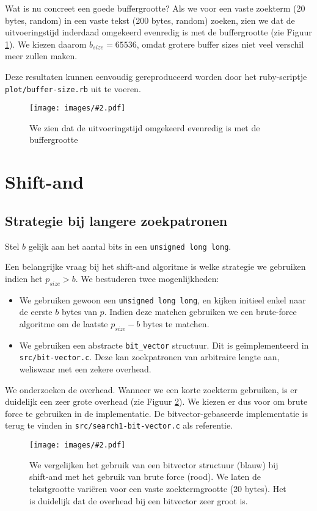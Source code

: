 \documentclass[a4paper,11pt]{article}
\newcommand{\image}[3][1]{
    \begin{figure}
    \begin{center}
    \texttt{[image: images/\#2.pdf]}
    \caption{#3}
    \label{fig:#2}
    \end{center}
    \end{figure}
}
\newcommand{\reproduce}[1]{
    Deze resultaten kunnen eenvoudig gereproduceerd worden door het
    ruby-scriptje \texttt{#1} uit te voeren.
}
\begin{document}
Wat is nu concreet een goede buffergrootte? Als we voor een vaste zoekterm (20
bytes, random) in een vaste tekst (200 bytes, random) zoeken, zien we dat de
uitvoeringstijd inderdaad omgekeerd evenredig is met de buffergrootte (zie
Figuur \ref{fig:plot-buffer-size}). We kiezen daarom $b_{size} = 65536$, omdat
grotere buffer sizes niet veel verschil meer zullen maken.

\reproduce{plot/buffer-size.rb}

\image{plot-buffer-size}{We zien dat de uitvoeringstijd omgekeerd evenredig is
met de buffergrootte}

\section{Shift-and}

\subsection{Strategie bij langere zoekpatronen}

Stel $b$ gelijk aan het aantal bits in een \verb#unsigned long long#.

Een belangrijke vraag bij het shift-and algoritme is welke strategie we
gebruiken indien het $p_{size} > b$. We bestuderen twee mogenlijkheden:

\begin{itemize}
    \item We gebruiken gewoon een \verb#unsigned long long#, en kijken initieel
    enkel naar de eerste $b$ bytes van $p$. Indien deze matchen gebruiken we een
    brute-force algoritme om de laatste $p_{size} - b$ bytes te matchen.
    \item We gebruiken een abstracte \verb$bit_vector$ structuur. Dit is
    ge\"implementeerd in \verb#src/bit-vector.c#. Deze kan zoekpatronen van
    arbitraire lengte aan, weliswaar met een zekere overhead.
\end{itemize}

We onderzoeken de overhead. Wanneer we een korte zoekterm gebruiken, is er
duidelijk een zeer grote overhead (zie Figuur \ref{fig:plot-bit-vector}).
We kiezen er dus voor om brute force te gebruiken in de implementatie.
De bitvector-gebaseerde implementatie is terug te vinden in
\verb#src/search1-bit-vector.c# als referentie.

\image{plot-bit-vector}{We vergelijken het gebruik van een bitvector structuur
(blauw) bij shift-and met het gebruik van brute force (rood). We laten de
tekstgrootte vari\"eren voor een vaste zoektermgrootte (20 bytes). Het is
duidelijk dat de overhead bij een bitvector zeer groot is.}
\end{document}
